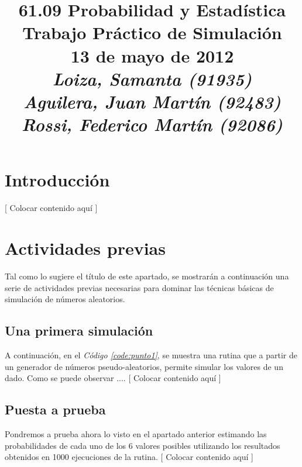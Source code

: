 \documentclass{article}
\newcommand{\refcode}[1]{\textit{Código \ref{#1}}}
\begin{document}
\title{\huge 61.09 Probabilidad y Estadística \\ 
	  \Huge Trabajo Práctico de Simulación \\
	  \bigskip \Large 13 de mayo de 2012 \\
	  \bigskip \large \textit{Loiza, Samanta (91935)\\Aguilera, Juan Martín (92483)\\Rossi, Federico Martín (92086)}}
\date{}
\maketitle


\section{Introducción}
[ Colocar contenido aquí ]



\section{Actividades previas}

Tal como lo sugiere el título de este apartado, se mostrarán a continuación una serie de actividades previas necesarias para dominar las técnicas básicas de simulación de números aleatorios.


\subsection{Una primera simulación}

A continuación, en el \refcode{code:punto1}, se muestra una rutina que a partir de un generador de números pseudo-aleatorios, permite simular los valores de un dado. Como se puede observar .... [ Colocar contenido aquí ]



\subsection{Puesta a prueba}

Pondremos a prueba ahora lo visto en el apartado anterior estimando las probabilidades de cada uno de los 6 valores posibles utilizando los resultados obtenidos en 1000 ejecuciones de la rutina. [ Colocar contenido aquí ]
\end{document}
